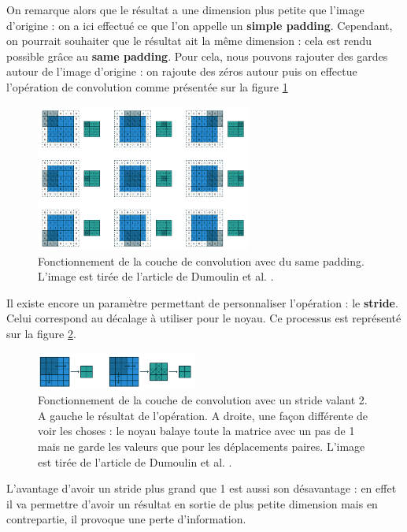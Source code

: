 On remarque alors que le résultat a une dimension plus petite que l'image d'origine : on a ici effectué ce que l'on appelle un \textbf{simple padding}. Cependant, on pourrait souhaiter que le résultat ait la même dimension : cela est rendu possible grâce au \textbf{same padding}. Pour cela, nous pouvons rajouter des gardes autour de l'image d'origine : on rajoute des zéros autour puis on effectue l'opération de convolution comme présentée sur la figure \ref{same_padding}

\begin{figure}[!h]
\centering
\includegraphics[width=200pt]{images/cnn/same_padding.png}
\caption{Fonctionnement de la couche de convolution avec du same padding. L'image est tirée de l'article de Dumoulin et al. \cite{dumoulin_guide_2018}.}
\label{same_padding}
\end{figure}

Il existe encore un paramètre permettant de personnaliser l'opération : le \textbf{stride}. Celui correspond au décalage à utiliser pour le noyau. Ce processus est représenté sur la figure \ref{stride}.

\begin{figure}[!h]
\centering
\includegraphics[width=150pt]{images/cnn/stride.png}
\caption{Fonctionnement de la couche de convolution avec un stride valant 2. A gauche le résultat de l'opération. A droite, une façon différente de voir les choses : le noyau balaye toute la matrice avec un pas de 1 mais ne garde les valeurs que pour les déplacements paires. L'image est tirée de l'article de Dumoulin et al. \cite{dumoulin_guide_2018}.}
\label{stride}
\end{figure}
 
L'avantage d'avoir un stride plus grand que 1 est aussi son désavantage : en effet il va permettre d'avoir un résultat en sortie de plus petite dimension mais en contrepartie, il provoque une perte d'information.

